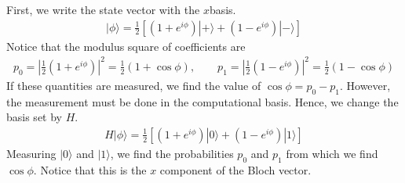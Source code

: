 \documentclass[letterpaper,10pt,english]{jupyterBook}
\begin{document}
\sphinxAtStartPar
First, we write the state vector with the \(x\)\sphinxhyphen{}basis.
\begin{equation*}
\begin{split}
|\phi\rangle = \frac{1}{2}\left[ (1+e^{i \phi}) |+\rangle + (1-e^{i \phi}) |-\rangle \right]
\end{split}
\end{equation*}
\sphinxAtStartPar
Notice that the modulus square of coefficients are
\begin{equation*}
\begin{split}
p_0 = \left | \frac{1}{2} (1+e^{i \phi}) \right |^2 =  \frac{1}{2}\left(1+\cos \phi\right), \qquad p_1 = \left | \frac{1}{2} (1-e^{i \phi}) \right |^2 = \frac{1}{2}\left(1-\cos \phi\right)
\end{split}
\end{equation*}
\sphinxAtStartPar
If these quantities are measured, we find the value of \(\cos\phi = p_0 - p_1\).  However, the measurement must be done in the computational basis. Hence, we change the basis set by \(H\).
\begin{equation*}
\begin{split}
H |\phi\rangle = \frac{1}{2}\left[ (1+e^{i \phi}) |0\rangle + (1-e^{i \phi}) |1\rangle \right]
\end{split}
\end{equation*}
\sphinxAtStartPar
Measuring \(|0\rangle\) and \(|1\rangle\), we find the probabilities \(p_0\) and \(p_1\) from which we find \(\cos \phi\).  Notice that this is the \(x\) component of the Bloch vector.
\end{document}
